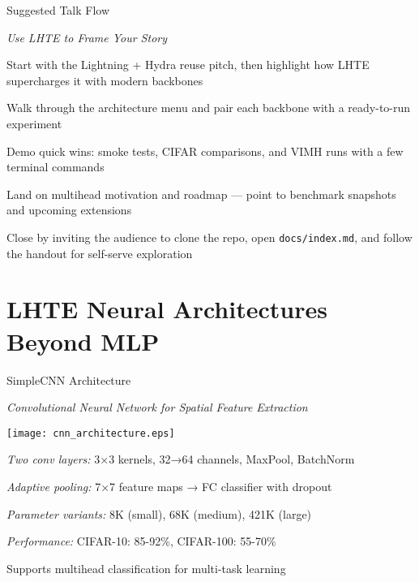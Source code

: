 \begin{slide}[\slideopts,toc={Talk Flow}]{Suggested Talk Flow}

  \emph{Use LHTE to Frame Your Story}

  \begin{itemize}
    \mpitem Start with the Lightning + Hydra reuse pitch, then highlight how LHTE supercharges it with modern backbones

    \mpitem Walk through the architecture menu and pair each backbone with a ready-to-run experiment

    \mpitem Demo quick wins: smoke tests, CIFAR comparisons, and VIMH runs with a few terminal commands

    \mpitem Land on multihead motivation and roadmap --- point to benchmark snapshots and upcoming extensions

    \mpitem Close by inviting the audience to clone the repo, open \texttt{docs/index.md}, and follow the handout for self-serve exploration
  \end{itemize}

\end{slide}

\section[toc={New Architectures}]{LHTE Neural Architectures Beyond MLP}

\begin{slidewhite}[\slideopts,toc={CNN}]{SimpleCNN Architecture}
  
  \emph{Convolutional Neural Network for Spatial Feature Extraction}
  
  \vspace{1em}

  \centerline{\texttt{[image: cnn\_architecture.eps]}}

  \begin{itemize}
    \mpitem \emph{Two conv layers:} 3×3 kernels, 32→64 channels, MaxPool, BatchNorm
    
    \mpitem \emph{Adaptive pooling:} 7×7 feature maps → FC classifier with dropout
    
    \mpitem \emph{Parameter variants:} 8K (small), 68K (medium), 421K (large)
    
    \mpitem \emph{Performance:} CIFAR-10: 85-92\%, CIFAR-100: 55-70\%
    
    \mpitem Supports multihead classification for multi-task learning
  \end{itemize}
  
\end{slidewhite}

